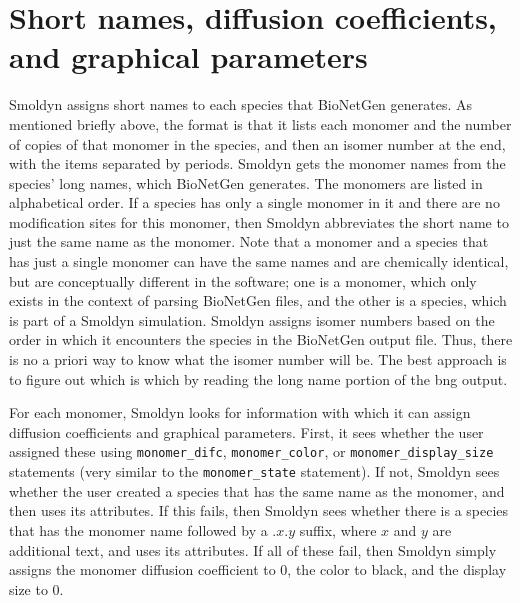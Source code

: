 \documentclass {scrbook}
\newcommand {\ttt} {\texttt}
\begin{document}
\section{Short names, diffusion coefficients, and graphical parameters}

Smoldyn assigns short names to each species that BioNetGen generates. As mentioned briefly above, the format is that it lists each monomer and the number of copies of that monomer in the species, and then an isomer number at the end, with the items separated by periods. Smoldyn gets the monomer names from the species' long names, which BioNetGen generates. The monomers are listed in alphabetical order. If a species has only a single monomer in it and there are no modification sites for this monomer, then Smoldyn abbreviates the short name to just the same name as the monomer. Note that a monomer and a species that has just a single monomer can have the same names and are chemically identical, but are conceptually different in the software; one is a monomer, which only exists in the context of parsing BioNetGen files, and the other is a species, which is part of a Smoldyn simulation. Smoldyn assigns isomer numbers based on the order in which it encounters the species in the BioNetGen output file. Thus, there is no a priori way to know what the isomer number will be. The best approach is to figure out which is which by reading the long name portion of the bng output.

For each monomer, Smoldyn looks for information with which it can assign diffusion coefficients and graphical parameters. First, it sees whether the user assigned these using \ttt{monomer\_difc}, \ttt{monomer\_color}, or \ttt{monomer\_display\_size} statements (very similar to the \ttt{monomer\_state} statement). If not, Smoldyn sees whether the user created a species that has the same name as the monomer, and then uses its attributes. If this fails, then Smoldyn sees whether there is a species that has the monomer name followed by a .$x$.$y$ suffix, where $x$ and $y$ are additional text, and uses its attributes. If all of these fail, then Smoldyn simply assigns the monomer diffusion coefficient to 0, the color to black, and the display size to 0.
\end{document}
